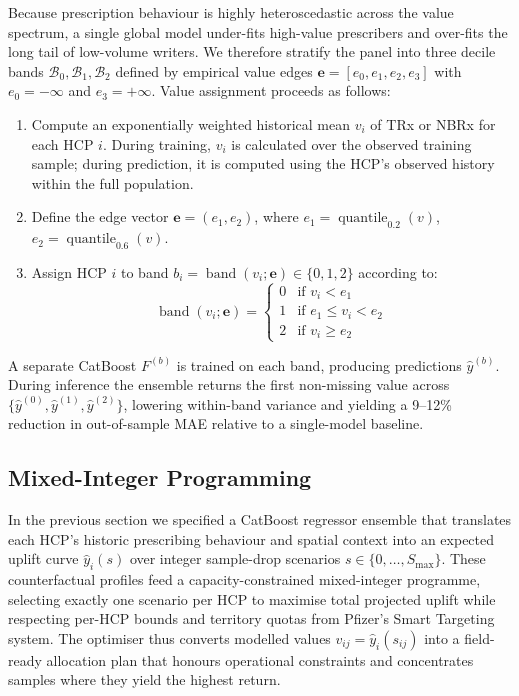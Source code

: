 Because prescription behaviour is highly heteroscedastic across the value spectrum, a single global model under-fits high-value prescribers and over-fits the long tail of low-volume writers. We therefore stratify the panel into three decile bands \(\mathcal{B}_0,\mathcal{B}_1,\mathcal{B}_2\) defined by empirical value edges \(\boldsymbol e=[e_0,e_1,e_2,e_3]\) with \(e_0=-\infty\) and \(e_3=+\infty\). Value assignment proceeds as follows:
\begin{enumerate}
  \item Compute an exponentially weighted historical mean \( v_i \) of TRx or NBRx for each HCP \( i \). During training, \( v_i \) is calculated over the observed training sample; during prediction, it is computed using the HCP's observed history within the full population.
  \item Define the edge vector \( \boldsymbol{e} = (e_1, e_2) \), where \( e_1 = \operatorname{quantile}_{0.2}(v) \), \( e_2 = \operatorname{quantile}_{0.6}(v) \).
  \item Assign HCP \( i \) to band \( b_i = \operatorname{band}(v_i; \boldsymbol{e}) \in \{0, 1, 2\} \) according to:
    \[
      \operatorname{band}(v_i; \boldsymbol{e}) =
      \begin{cases}
        0 & \text{if } v_i < e_1 \\
        1 & \text{if } e_1 \leq v_i < e_2 \\
        2 & \text{if } v_i \geq e_2
      \end{cases}
    \]
\end{enumerate}

A separate CatBoost \(F^{(b)}\) is trained on each band, producing predictions \(\hat y^{(b)}\). During inference the ensemble returns the first non-missing value across \(\{\hat y^{(0)},\hat y^{(1)},\hat y^{(2)}\}\), lowering within-band variance and yielding a 9--12\% reduction in out-of-sample MAE relative to a single-model baseline.

\subsection{Mixed-Integer Programming}
\label{sec:mip_overview}

In the previous section we specified a CatBoost regressor ensemble that translates each HCP's historic prescribing behaviour and spatial context into an expected uplift curve \(\widehat y_i(s)\) over integer sample-drop scenarios \(s\in\{0,\dots,S_{\max}\}\). These counterfactual profiles feed a capacity-constrained mixed-integer programme, selecting exactly one scenario per HCP to maximise total projected uplift while respecting per-HCP bounds and territory quotas from Pfizer's Smart Targeting system. The optimiser thus converts modelled values \(v_{ij}=\widehat y_i(s_{ij})\) into a field-ready allocation plan that honours operational constraints and concentrates samples where they yield the highest return.

